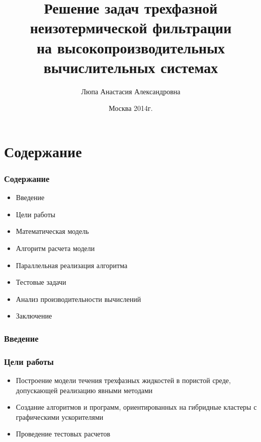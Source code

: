 \documentclass[10pt,pdf,hyperref={unicode}]{beamer} %
\title{ Решение задач трехфазной неизотермической фильтрации \\
на высокопроизводительных вычислительных системах}
\author{Люпа Анастасия Александровна}
\institute{Московский физико-технический институт \\
(государственный университет)\\
Факультет управления и прикладной математики \\
Кафедра математического моделирования \\
    \vspace{0.2cm}
    Научный руководитель: с.н.с., к.ф.-м.н. Чурбанова Н.Г.\\
}
\date{
    Москва 2014г.
}
\begin{document}
\begin{frame}
  \maketitle
\end{frame}

\section{Содержание}

\begin{frame}
\begin{center}
\frametitle{Содержание}
\begin{itemize}
\item {\large Введение}
\vspace{0.3cm}
\item {\large Цели работы}
\vspace{0.3cm}
\item {\large Математическая модель}
\vspace{0.3cm}
\item {\large Алгоритм расчета модели}
\vspace{0.3cm}
\item {\large Параллельная реализация алгоритма}
\vspace{0.3cm}
\item {\large Тестовые задачи}
\vspace{0.3cm}
\item {\large Анализ производительности вычислений}
\vspace{0.3cm}
\item {\large Заключение}
\end{itemize}
\end{center}
\end{frame}

\begin{frame}
\begin{center}
\frametitle{Введение}

\end{center}
\end{frame}

\begin{frame}
\begin{center}
\frametitle{Цели работы}
\begin{itemize}
\item {\large Построение модели течения трехфазных жидкостей в пористой среде, допускающей реализацию явными методами\\}
\vspace{0.5cm}
\item {\large Создание алгоритмов и программ, ориентированных на гибридные кластеры с графическими ускорителями\\}
\vspace{0.5cm}
\item {\large Проведение тестовых расчетов}
\end{itemize}
\end{center}
\end{frame}
\end{document}
